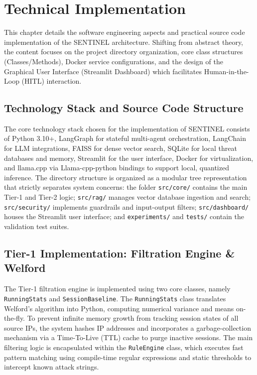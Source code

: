 \chapter{Technical Implementation}
\label{ch:implementation}

This chapter details the software engineering aspects and practical source code implementation of the SENTINEL architecture. Shifting from abstract theory, the content focuses on the project directory organization, core class structures (Classes/Methods), Docker service configurations, and the design of the Graphical User Interface (Streamlit Dashboard) which facilitates Human-in-the-Loop (HITL) interaction.

\section{Technology Stack and Source Code Structure}
The core technology stack chosen for the implementation of SENTINEL consists of Python 3.10+, LangGraph for stateful multi-agent orchestration, LangChain for LLM integrations, FAISS for dense vector search, SQLite for local threat databases and memory, Streamlit for the user interface, Docker for virtualization, and llama.cpp via Llama-cpp-python bindings to support local, quantized inference. The directory structure is organized as a modular tree representation that strictly separates system concerns: the folder \texttt{src/core/} contains the main Tier-1 and Tier-2 logic; \texttt{src/rag/} manages vector database ingestion and search; \texttt{src/security/} implements guardrails and input-output filters; \texttt{src/dashboard/} houses the Streamlit user interface; and \texttt{experiments/} and \texttt{tests/} contain the validation test suites.

\section{Tier-1 Implementation: Filtration Engine \& Welford}
The Tier-1 filtration engine is implemented using two core classes, namely \texttt{RunningStats} and \texttt{SessionBaseline}. The \texttt{RunningStats} class translates Welford's algorithm into Python, computing numerical variance and means on-the-fly. To prevent infinite memory growth from tracking session states of all source IPs, the system hashes IP addresses and incorporates a garbage-collection mechanism via a Time-To-Live (TTL) cache to purge inactive sessions. The main filtering logic is encapsulated within the \texttt{RuleEngine} class, which executes fast pattern matching using compile-time regular expressions and static thresholds to intercept known attack strings.

